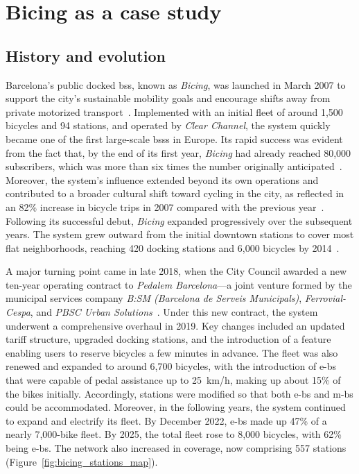 \chapter{Bicing as a case study}
\label{ch:use_case_bicing}

\section{History and evolution}

Barcelona’s public docked \ac{bss}, known as \textit{Bicing}, was launched in March 2007 to support the city’s sustainable mobility goals and encourage shifts away from private motorized transport~\cite{Winslow2019}. Implemented with an initial fleet of around 1,500 bicycles and 94 stations, and operated by \textit{Clear Channel}, the system quickly became one of the first large-scale \acp{bss} in Europe. Its rapid success was evident from the fact that, by the end of its first year, \textit{Bicing} had already reached 80,000 subscribers, which was more than six times the number originally anticipated~\cite{Winkels2007}. Moreover, the system’s influence extended beyond its own operations and contributed to a broader cultural shift toward cycling in the city, as reflected in an 82\% increase in bicycle trips in 2007 compared with the previous year~\cite{Winslow2019}. Following its successful debut, \textit{Bicing} expanded progressively over the subsequent years. The system grew outward from the initial downtown stations to cover most flat neighborhoods, reaching 420 docking stations and 6,000 bicycles by 2014~\cite{Winslow2019}. 

A major turning point came in late 2018, when the City Council awarded a new ten-year operating contract to \textit{Pedalem Barcelona}—a joint venture formed by the municipal services company \textit{B:SM (Barcelona de Serveis Municipals)}, \textit{Ferrovial-Cespa}, and \textit{PBSC Urban Solutions}~\cite{ElPais2017}. Under this new contract, the system underwent a comprehensive overhaul in 2019. Key changes included an updated tariff structure, upgraded docking stations, and the introduction of a feature enabling users to reserve bicycles a few minutes in advance. The fleet was also renewed and expanded to around 6,700 bicycles, with the introduction of \acp{e-b} that were capable of pedal assistance up to 25~km/h, making up about 15\% of the bikes initially. Accordingly, stations were modified so that both \acp{e-b} and \acp{m-b} could be accommodated. Moreover, in the following years, the system continued to expand and electrify its fleet. By December 2022, \acp{e-b} made up 47\% of a nearly 7,000-bike fleet. By 2025, the total fleet rose to 8,000 bicycles, with 62\% being \acp{e-b}. The network also increased in coverage, now comprising 557 stations (Figure~\ref{fig:bicing_stations_map}).

